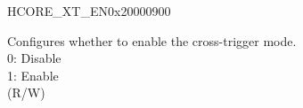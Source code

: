 \begin{register}{H}{CORE\_XT\_EN}{0x20000900}\label{regdesc:CTI_EN}
%
%
\regnewline%
\begin{regdesc}\begin{reglist}
\label{fielddesc:XT_EN}\item [XT\_EN] Configures whether to enable the cross-trigger mode.\\
0: Disable\\
1: Enable\\
(R/W)
\end{reglist}\end{regdesc}
\end{register}
